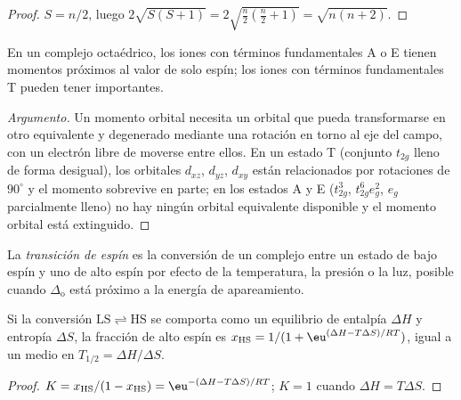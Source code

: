 \begin{proof}
$S = n/2$, luego $2\sqrt{S(S+1)} = 2\sqrt{\frac n2(\frac n2 + 1)} = \sqrt{n(n+2)}$.
\end{proof}

\begin{proposition}\label{prop:b3:complex-spectra-magnetism:orbital-contribution}
En un complejo octaédrico, los iones con términos fundamentales A o E tienen momentos próximos al
valor de solo espín; los iones con términos fundamentales T pueden tener 
importantes.
\end{proposition}

\begin{proof}[Argumento]
Un momento orbital necesita un orbital que pueda transformarse en otro equivalente y
degenerado mediante una rotación en torno al eje del campo, con un electrón libre de
moverse entre ellos. En un estado T (conjunto $t_{2g}$ lleno de forma desigual), los orbitales $d_{xz}$, $d_{yz}$, $d_{xy}$
están relacionados por rotaciones de $90^\circ$ y el momento sobrevive en parte; en los estados A y E
($t_{2g}^3$, $t_{2g}^6e_g^2$, $e_g$ parcialmente lleno) no hay ningún orbital equivalente disponible y el
momento orbital está extinguido.
\end{proof}

\begin{definition}\label{def:b3:complex-spectra-magnetism:spin-crossover}
La \emph{transición de espín} es la conversión de un complejo entre
un estado de bajo espín y uno de alto espín por efecto de la temperatura, la presión o la luz, posible
cuando $\Delta_{\mathrm o}$ está próximo a la energía de apareamiento.
\end{definition}

\begin{proposition}\label{prop:b3:complex-spectra-magnetism:crossover}
Si la conversión $\mathrm{LS} \rightleftharpoons \mathrm{HS}$ se comporta como un equilibrio de entalpía $\Delta H$ y entropía $\Delta S$, la
fracción de alto espín es $x_{\mathrm{HS}} = 1/(1 + \eu^{(\Delta H - T\Delta S)/RT})$, igual a un medio en $T_{1/2} = \Delta H/\Delta S$.
\end{proposition}

\begin{proof}
$K = x_{\mathrm{HS}}/(1 - x_{\mathrm{HS}}) = \eu^{-(\Delta H - T\Delta S)/RT}$; $K = 1$ cuando $\Delta H = T\Delta S$.
\end{proof}

